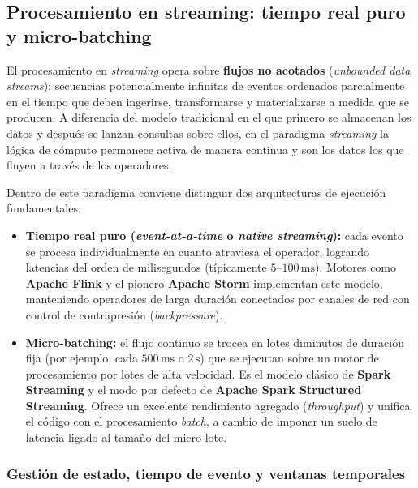 \subsection{Procesamiento en streaming: tiempo real puro y micro-batching}\label{subsec:streaming}

El procesamiento en \textit{streaming} opera sobre \textbf{flujos no acotados} (\textit{unbounded data streams}): secuencias potencialmente infinitas de eventos ordenados parcialmente en el tiempo que deben ingerirse, transformarse y materializarse a medida que se producen. A diferencia del modelo tradicional en el que primero se almacenan los datos y después se lanzan consultas sobre ellos, en el paradigma \textit{streaming} la lógica de cómputo permanece activa de manera continua y son los datos los que fluyen a través de los operadores.

Dentro de este paradigma conviene distinguir dos arquitecturas de ejecución fundamentales:

\begin{itemize}
  \item \textbf{Tiempo real puro (\textit{event-at-a-time} o \textit{native streaming}):} cada evento se procesa individualmente en cuanto atraviesa el operador, logrando latencias del orden de milisegundos (típicamente $5\text{--}100\,\text{ms}$). Motores como \textbf{Apache Flink} y el pionero \textbf{Apache Storm} implementan este modelo, manteniendo operadores de larga duración conectados por canales de red con control de contrapresión (\textit{backpressure}).
  \item \textbf{Micro-batching:} el flujo continuo se trocea en lotes diminutos de duración fija (por ejemplo, cada $500\,\text{ms}$ o $2\,\text{s}$) que se ejecutan sobre un motor de procesamiento por lotes de alta velocidad. Es el modelo clásico de \textbf{Spark Streaming} y el modo por defecto de \textbf{Apache Spark Structured Streaming}. Ofrece un excelente rendimiento agregado (\textit{throughput}) y unifica el código con el procesamiento \textit{batch}, a cambio de imponer un suelo de latencia ligado al tamaño del micro-lote.
\end{itemize}

\subsubsection{Gestión de estado, tiempo de evento y ventanas temporales}


